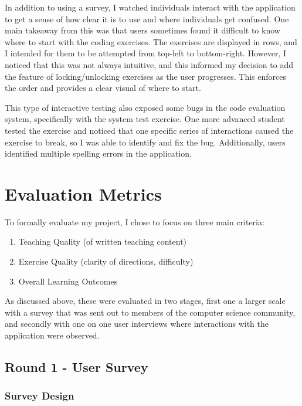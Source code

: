 \documentclass[10pt,twocolumn]{article}
\begin{document}
In addition to using a survey, I watched individuals interact with the application to get a sense of how clear it is to 
use and where individuals get confused. One main takeaway from this was that users sometimes found it difficult to know 
where to start with the coding exercises. The exercises are displayed in rows, and I intended for them to be attempted 
from top-left to bottom-right. However, I noticed that this was not always intuitive, and this informed my decision to 
add the feature of locking/unlocking exercises as the user progresses. This enforces the order and provides a clear visual
of where to start. 

This type of interactive testing also exposed some bugs in the code evaluation system, specifically with the system test
exercise. One more advanced student tested the exercise and noticed that one specific series of interactions caused the 
exercise to break, so I was able to identify and fix the bug. Additionally, users identified multiple spelling errors in 
the application. 


\section{Evaluation Metrics}

To formally evaluate my project, I chose to focus on three main criteria:

\begin{enumerate}
    \item Teaching Quality (of written teaching content)
    \item Exercise Quality (clarity of directions, difficulty)
    \item Overall Learning Outcomes
\end{enumerate}

As discussed above, these were evaluated in two stages, first one a larger scale with a survey that was sent out to 
members of the computer science community, and secondly with one on one user interviews where interactions with the 
application were observed. 

\subsection{Round 1 - User Survey}

\subsubsection{Survey Design}
\end{document}
